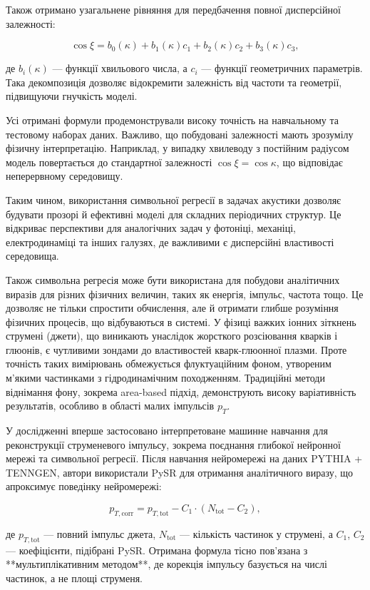 \documentclass[14pt,a4paper,titlepage,oneside]{book}
\numberwithin{equation}{part}
\begin{document}
Також отримано узагальнене рівняння для передбачення повної дисперсійної залежності:

\[
\cos \xi = b_0(\kappa) + b_1(\kappa)c_1 + b_2(\kappa)c_2 + b_3(\kappa)c_3,
\]

де $b_i(\kappa)$ — функції хвильового числа, а $c_i$ — функції геометричних параметрів. Така декомпозиція дозволяє відокремити залежність від частоти та геометрії, підвищуючи гнучкість моделі.

Усі отримані формули продемонстрували високу точність на навчальному та тестовому наборах даних. Важливо, що побудовані залежності мають зрозумілу фізичну інтерпретацію. Наприклад, у випадку хвилеводу з постійним радіусом модель повертається до стандартної залежності $\cos \xi = \cos \kappa$, що відповідає неперервному середовищу.

Таким чином, використання символьної регресії в задачах акустики дозволяє будувати прозорі й ефективні моделі для складних періодичних структур. Це відкриває перспективи для аналогічних задач у фотоніці, механіці, електродинаміці та інших галузях, де важливими є дисперсійні властивості середовища.

Також символьна регресія може бути використана для побудови аналітичних виразів для різних фізичних величин, таких як енергія, імпульс, частота тощо. Це дозволяє не тільки спростити обчислення, але й отримати глибше розуміння фізичних процесів, що відбуваються в системі.
У фізиці важких іонних зіткнень струмені (джети), що виникають унаслідок жорсткого розсіювання кварків і глюонів, є чутливими зондами до властивостей кварк-глюонної плазми. Проте точність таких вимірювань обмежується флуктуаційним фоном, утвореним м’якими частинками з гідродинамічним походженням. Традиційні методи віднімання фону, зокрема area-based підхід, демонструють високу варіативність результатів, особливо в області малих імпульсів $p_T$.

У дослідженні \cite{ion_pysr} вперше застосовано інтерпретоване машинне навчання для реконструкції струменевого імпульсу, зокрема поєднання глибокої нейронної мережі та символьної регресії. Після навчання нейромережі на даних PYTHIA + TENNGEN, автори використали PySR для отримання аналітичного виразу, що апроксимує поведінку нейромережі:

\[
p_{T,\text{corr}} = p_{T,\text{tot}} - C_1 \cdot (N_{\text{tot}} - C_2),
\]

де $p_{T,\text{tot}}$ — повний імпульс джета, $N_{\text{tot}}$ — кількість частинок у струмені, а $C_1$, $C_2$ — коефіцієнти, підібрані PySR. Отримана формула тісно пов’язана з **мультиплікативним методом**, де корекція імпульсу базується на числі частинок, а не площі струменя.
\end{document}
